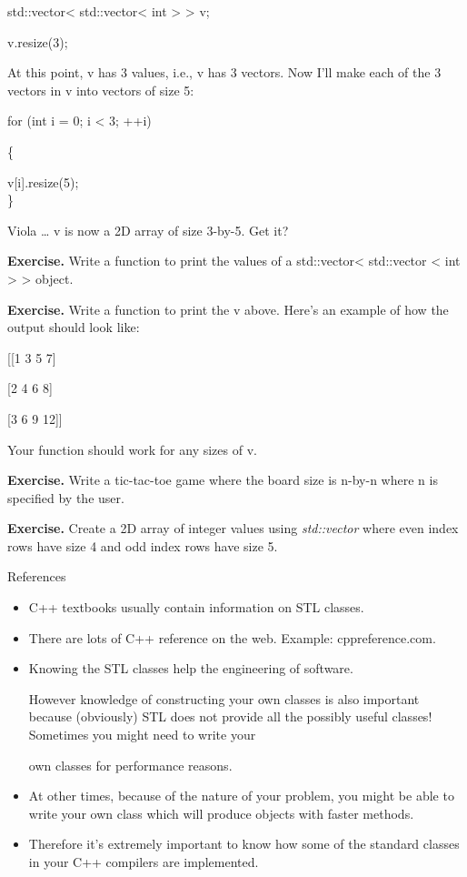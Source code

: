 \documentclass[
]{article}
\begin{document}
std::vector\textless{} std::vector\textless{} int \textgreater{}
\textgreater{} v;

v.resize(3);

At this point, v has 3 values, i.e., v has 3 vectors. Now I'll make each
of the 3 vectors in v into vectors of size 5:

for (int i = 0; i \textless{} 3; ++i)

\{

v{[}i{]}.resize(5);\\
\}

Viola \ldots{} v is now a 2D array of size 3-by-5. Get it?

\textbf{Exercise.} Write a function to print the values of a
std::vector\textless{} std::vector \textless{} int \textgreater{}
\textgreater{} object.

\textbf{Exercise.} Write a function to print the v above. Here's an
example of how the output should look like:

{[}{[}1 3 5 7{]}

{[}2 4 6 8{]}

{[}3 6 9 12{]}{]}

Your function should work for any sizes of v.

\textbf{Exercise.} Write a tic-tac-toe game where the board size is
n-by-n where n is specified by the user.

\textbf{\hfill\break
Exercise. }Create a 2D array of integer values using \emph{std::vector}
where even index rows have size 4 and odd index rows have size 5.

References

\begin{itemize}
\item
  C++ textbooks usually contain information on STL classes.
\item
  There are lots of C++ reference on the web. Example: cppreference.com.
\item
  Knowing the STL classes help the engineering of software.

  However knowledge of constructing your own classes is also important
  because (obviously) STL does not provide all the possibly useful
  classes! Sometimes you might need to write your

  own classes for performance reasons.
\item
  At other times, because of the nature of your problem, you might be
  able to write your own class which will produce objects with faster
  methods.
\item
  Therefore it's extremely important to know how some of the standard
  classes in your C++ compilers are implemented.
\end{itemize}
\end{document}
